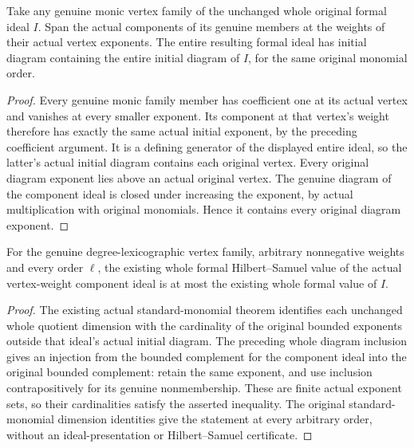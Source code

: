 \begin{theorem}
\label{hir:actual-weighted-vertex-ideal-diagram-inclusion}
\leanok
Take any genuine monic vertex family of the unchanged whole original
formal ideal $I$. Span the actual components of its genuine members at
the weights of their actual vertex exponents. The entire resulting
formal ideal has initial diagram containing the entire initial diagram
of $I$, for the same original monomial order.
\end{theorem}
\begin{proof}
Every genuine monic family member has coefficient one at its actual
vertex and vanishes at every smaller exponent. Its component at that
vertex's weight therefore has exactly the same actual initial exponent,
by the preceding coefficient argument. It is a defining generator of
the displayed entire ideal, so the latter's actual initial diagram
contains each original vertex. Every original diagram exponent lies
above an actual original vertex. The genuine diagram of the component
ideal is closed under increasing the exponent, by actual multiplication
with original monomials. Hence it contains every original diagram exponent.
\end{proof}

\begin{theorem}
\label{hir:actual-weighted-vertex-ideal-hs-bound}
\leanok
For the genuine degree-lexicographic vertex family, arbitrary
nonnegative weights and every order $\ell$, the existing whole formal
Hilbert--Samuel value of the actual vertex-weight component ideal is
at most the existing whole formal value of $I$.
\end{theorem}
\begin{proof}
The existing actual standard-monomial theorem identifies each unchanged
whole quotient dimension with the cardinality of the original bounded
exponents outside that ideal's actual initial diagram. The preceding
whole diagram inclusion gives an injection from the bounded complement
for the component ideal into the original bounded complement: retain
the same exponent, and use inclusion contrapositively for its genuine
nonmembership. These are finite actual exponent sets, so their
cardinalities satisfy the asserted inequality. The original standard-
monomial dimension identities give the statement at every arbitrary
order, without an ideal-presentation or Hilbert--Samuel certificate.
\end{proof}

